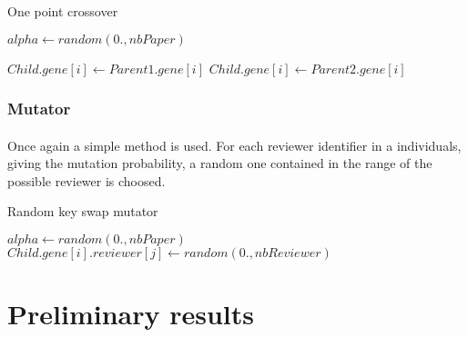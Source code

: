 \documentclass{article}
\begin{document}
      \begin{algorithm}
      \caption{One point crossover}\label{pseudo1}
      \begin{algorithmic}[1]
      \State $alpha\gets random(0.,nbPaper)$ 
        
          \State $Child.gene[i]\gets Parent1.gene[i]$
        \Else
          \State $Child.gene[i]\gets Parent2.gene[i]$
        \EndIf

      \EndFor
      \EndProcedure
      \end{algorithmic}
      \end{algorithm}

    
    
    \subsubsection{Mutator} %
    \label{ssub:Mutator}
    
      \paragraph{} %
      \label{par:}
      Once again a simple method is used. For each reviewer identifier in a
      individuals, giving the mutation probability, a random one contained in the
      range of the possible reviewer is choosed.

      \begin{algorithm}
      \caption{Random key swap mutator}\label{pseudo2}
      \begin{algorithmic}[2]
      \State $alpha\gets random(0.,nbPaper)$ 
            \State $Child.gene[i].reviewer[j]\gets random(0., nbReviewer)$
          \EndFor
        \EndFor
      \EndProcedure
      \end{algorithmic}
      \end{algorithm}


  \section{Preliminary results} %
  \label{sec:Preliminaty Result}
    
\end{document}
